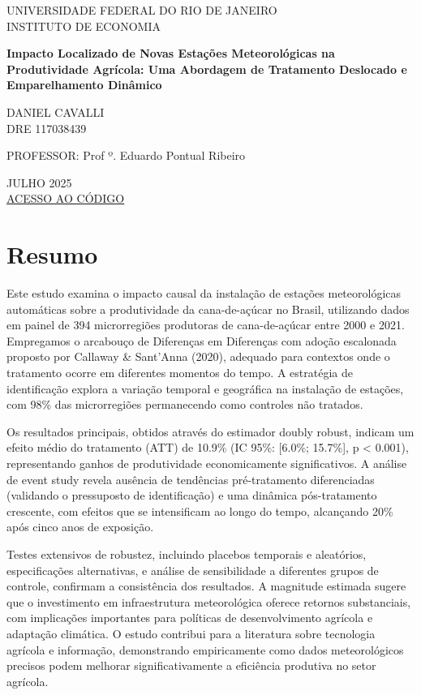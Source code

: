 \documentclass[
  brazilian,
  12pt,
  a4paper,
]{article}
\author{}
\date{}
\begin{document}
{
\setcounter{tocdepth}{3}
\tableofcontents
}
UNIVERSIDADE FEDERAL DO RIO DE JANEIRO\\
INSTITUTO DE ECONOMIA

\textbf{Impacto Localizado de Novas Estações Meteorológicas na
Produtividade Agrícola: Uma Abordagem de Tratamento Deslocado e
Emparelhamento Dinâmico}

DANIEL CAVALLI\\
DRE 117038439

PROFESSOR: Prof º. Eduardo Pontual Ribeiro

JULHO 2025\\
\href{https://github.com/danielcavalli/tcc-ie-ufrj-2024}{ACESSO AO
CÓDIGO}

\section{Resumo}\label{resumo}

Este estudo examina o impacto causal da instalação de estações
meteorológicas automáticas sobre a produtividade da cana-de-açúcar no
Brasil, utilizando dados em painel de 394 microrregiões produtoras de
cana-de-açúcar entre 2000 e 2021. Empregamos o arcabouço de Diferenças
em Diferenças com adoção escalonada proposto por Callaway \& Sant'Anna
(2020), adequado para contextos onde o tratamento ocorre em diferentes
momentos do tempo. A estratégia de identificação explora a variação
temporal e geográfica na instalação de estações, com 98\% das
microrregiões permanecendo como controles não tratados.

Os resultados principais, obtidos através do estimador doubly robust,
indicam um efeito médio do tratamento (ATT) de 10.9\% (IC 95\%:
{[}6.0\%; 15.7\%{]}, p \textless{} 0.001), representando ganhos de
produtividade economicamente significativos. A análise de event study
revela ausência de tendências pré-tratamento diferenciadas (validando o
pressuposto de identificação) e uma dinâmica pós-tratamento crescente,
com efeitos que se intensificam ao longo do tempo, alcançando 20\% após
cinco anos de exposição.

Testes extensivos de robustez, incluindo placebos temporais e
aleatórios, especificações alternativas, e análise de sensibilidade a
diferentes grupos de controle, confirmam a consistência dos resultados.
A magnitude estimada sugere que o investimento em infraestrutura
meteorológica oferece retornos substanciais, com implicações importantes
para políticas de desenvolvimento agrícola e adaptação climática. O
estudo contribui para a literatura sobre tecnologia agrícola e
informação, demonstrando empiricamente como dados meteorológicos
precisos podem melhorar significativamente a eficiência produtiva no
setor agrícola.
\end{document}
